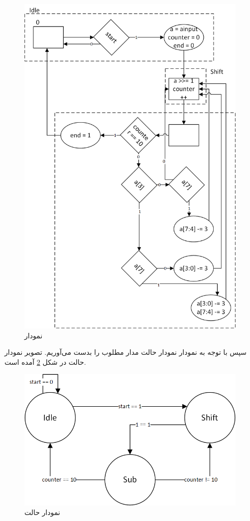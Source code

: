 \documentclass[fleqn]{article}
\begin{document}
\begin{figure}[!htbp]
    \includegraphics[width=\textwidth]{Assets/ASM.png}
    \caption{نمودار }
    \label{asm}
\end{figure}

سپس با توجه به نمودار 
نمودار حالت مدار مطلوب را بدست می‌آوریم. تصویر نمودار حالت در شکل 
\ref{sd}
آمده است. 

\begin{figure}[!htbp]
    \includegraphics[width=\textwidth]{Assets/SD.png}
    \caption{نمودار حالت}
    \label{sd}
\end{figure}
\end{document}
